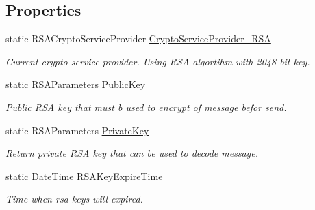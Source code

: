 \subsection*{Properties}
\begin{DoxyCompactItemize}
\item 
static R\+S\+A\+Crypto\+Service\+Provider \mbox{\hyperlink{class_pipes_provider_1_1_security_1_1_crypto_ab1a4a6dad6ba4bad8e95587ae9c9ef28}{Crypto\+Service\+Provider\+\_\+\+R\+SA}}
\begin{DoxyCompactList}\small\item\em Current crypto service provider. Using R\+SA algortihm with 2048 bit key. \end{DoxyCompactList}\item 
static R\+S\+A\+Parameters \mbox{\hyperlink{class_pipes_provider_1_1_security_1_1_crypto_a1813c1f43bdb164e4e023947e0cad08c}{Public\+Key}}
\begin{DoxyCompactList}\small\item\em Public R\+SA key that must b used to encrypt of message befor send. \end{DoxyCompactList}\item 
static R\+S\+A\+Parameters \mbox{\hyperlink{class_pipes_provider_1_1_security_1_1_crypto_adcb692dbcece7db4e96f4bce92daabd0}{Private\+Key}}
\begin{DoxyCompactList}\small\item\em Return private R\+SA key that can be used to decode message. \end{DoxyCompactList}\item 
static Date\+Time \mbox{\hyperlink{class_pipes_provider_1_1_security_1_1_crypto_aee1d631c98ae7aff552257befa32c37d}{R\+S\+A\+Key\+Expire\+Time}}
\begin{DoxyCompactList}\small\item\em Time when rsa keys will expired. \end{DoxyCompactList}\end{DoxyCompactItemize}

